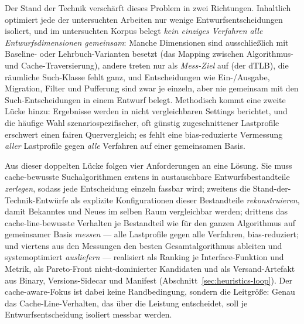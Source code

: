 \begin{nurlang}
Der Stand der Technik verschärft dieses Problem in zwei Richtungen. Inhaltlich optimiert jede der
untersuchten Arbeiten nur wenige Entwurfsentscheidungen isoliert, und im untersuchten Korpus belegt
\emph{kein einziges Verfahren alle Entwurfsdimensionen gemeinsam}: Manche Dimensionen sind ausschließlich
mit Baseline- oder Lehrbuch-Varianten besetzt (das Mapping zwischen Algorithmus- und Cache-Traversierung),
andere treten nur als \emph{Mess-Ziel} auf (der dTLB), die räumliche Such-Klasse fehlt ganz, und
Entscheidungen wie Ein-/Ausgabe, Migration, Filter und Pufferung sind zwar je einzeln, aber nie gemeinsam
mit den Such-Entscheidungen in einem Entwurf belegt. Methodisch kommt eine zweite Lücke hinzu: Ergebnisse
werden in nicht vergleichbaren Settings berichtet, und die häufige Wahl szenariospezifischer, oft günstig
zugeschnittener Lastprofile erschwert einen fairen Quervergleich; es fehlt eine bias-reduzierte
Vermessung \emph{aller} Lastprofile gegen \emph{alle} Verfahren auf einer gemeinsamen Basis.

Aus dieser doppelten Lücke folgen vier Anforderungen an eine Lösung. Sie muss cache-bewusste
Suchalgorithmen erstens in austauschbare Entwurfsbestandteile \emph{zerlegen}, sodass jede Entscheidung
einzeln fassbar wird; zweitens die Stand-der-Technik-Entwürfe als explizite Konfigurationen dieser
Bestandteile \emph{rekonstruieren}, damit Bekanntes und Neues im selben Raum vergleichbar werden;
drittens das cache-line-bewusste Verhalten je Bestandteil wie für den ganzen Algorithmus auf gemeinsamer
Basis \emph{messen} --- alle Lastprofile gegen alle Verfahren, bias-reduziert; und viertens aus den
Messungen den besten Gesamtalgorithmus ableiten und systemoptimiert \emph{ausliefern} --- realisiert
als Ranking je Interface-Funktion und Metrik, als Pareto-Front nicht-dominierter Kandidaten und als
Versand-Artefakt aus Binary, Versions-Sidecar und Manifest (Abschnitt~\ref{sec:heuristics-loop}). Der
cache-aware-Fokus ist dabei keine Randbedingung, sondern die Leitgröße: Genau das Cache-Line-Verhalten,
das über die Leistung entscheidet, soll je Entwurfsentscheidung isoliert messbar werden.
\end{nurlang}
